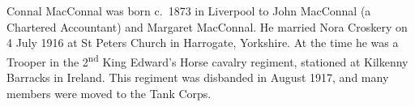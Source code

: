 
Connal MacConnal was born c.~1873 in  Liverpool \cite{ConnalNoraMarriage, ConnalFreeBMD} to John MacConnal (a Chartered Accountant) and Margaret MacConnal. \cite{CMacConnalBirth} He married Nora Croskery  on 4 July 1916 at St Peters Church in Harrogate, Yorkshire.\cite{ConnalNoraMarriage} At the time he was a Trooper in the 2\textsuperscript{nd} King Edward's Horse cavalry regiment, stationed at Kilkenny Barracks in Ireland.\cite{ConnalNoraMarriage} This regiment was disbanded in August 1917, and many members were moved to the Tank Corps.\cite{WP-KingEdsHorse}
